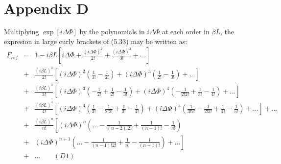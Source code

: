 \documentclass [12pt]{article}
\begin{document}
{  \section*{\bf Appendix D}
  \par Multiplying $\exp[i\Delta \Phi]$ by the polynomials in $i\Delta \Phi$
   at each order in $\beta L$, the expresion in large curly brackets of (5.33) may be
    written as:
   \begin{eqnarray}
 F_{ref} & = & 1-i\beta L \left[i\Delta \Phi +\frac{(i\Delta \Phi)^2}{2!}+\frac{(i\Delta \Phi)^3}{3!}
   +...\right] \nonumber \\
     & + & \frac{(i\beta L)^2}{2!}\left[(i\Delta \Phi)^2 \left( \frac{1}{1!}-\frac{1}{2!}\right)+
     (i\Delta \Phi)^3 \left(\frac{1}{2!}-\frac{1}{3!}\right)+...\right]  \nonumber \\
     & + & \frac{(i\beta L)^3}{3!}\left[(i\Delta \Phi)^3 \left(-\frac{1}{2!}+\frac{1}{2!}-\frac{1}{3!}\right)+
     (i\Delta \Phi)^4 \left(-\frac{1}{2!2!}+\frac{1}{3!} -\frac{1}{4!} \right)+...\right]  \nonumber \\     
   & + & \frac{(i\beta L)^4}{4!}\left[(i\Delta \Phi)^4 \left(\frac{1}{3!}-\frac{1}{2!2!}
    +\frac{1}{3!}-\frac{1}{4!}\right)+
     (i\Delta \Phi)^5\left(\frac{1}{3!2!}-\frac{1}{2!3!} +\frac{1}{4!}- \frac{1}{5!}  \right)+...\right] +... \nonumber \\
   & + & \frac{(i\beta L)^n}{n!}\left[(i\Delta \Phi)^n\left(...-\frac{1}{(n-2)!2!}+\frac{1}{(n-1)!} 
    -  \frac{1}{n!}\right) \right. \nonumber \\
   & + & \left. (i\Delta \Phi)^{n+1}\left(...-\frac{1}{(n-1)!2!}+\frac{1}{n!} -\frac{1}{(n+1)!} \right)+...\right]
  \nonumber \\
   & +  & ... ~~~~~~~~~(D1) \nonumber
 \end{eqnarray}

}
\end{document}
